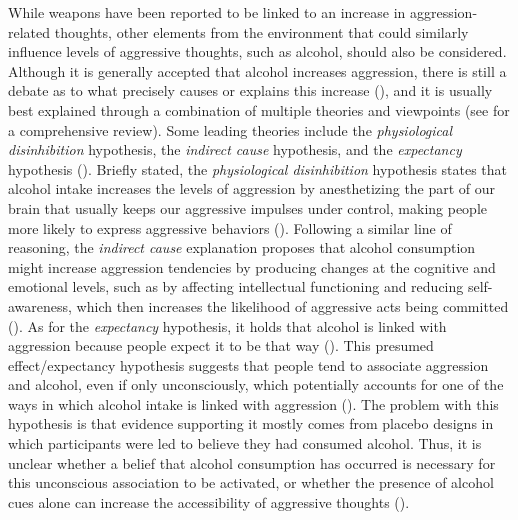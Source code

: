\documentclass[serif, authordate, twocolumn, empirical]{jote-article}
\begin{document}
While weapons have been reported to be linked to an increase in aggression-related thoughts, other elements from the environment that could similarly influence levels of aggressive thoughts, such as alcohol, should also be considered. Although it is generally accepted that alcohol increases aggression, there is still a debate as to what precisely causes or explains this increase (), and it is usually best explained through a combination of multiple theories and viewpoints (see   for a comprehensive review). Some leading theories include the \textit{physiological disinhibition} hypothesis, the \textit{indirect cause} hypothesis, and the \textit{expectancy }hypothesis (\cite{Bushman2002}). Briefly stated, the \textit{physiological disinhibition} hypothesis states that alcohol intake increases the levels of aggression by anesthetizing the part of our brain that usually keeps our aggressive impulses under control, making people more likely to express aggressive behaviors (\cite{Bushman2002}). Following a similar line of reasoning, the \textit{indirect cause} explanation proposes that alcohol consumption might increase aggression tendencies by producing changes at the cognitive and emotional levels, such as by affecting intellectual functioning and reducing self-awareness, which then increases the likelihood of aggressive acts being committed (\cite{Bushman2002}). As for the \textit{expectancy }hypothesis, it holds that alcohol is linked with aggression because people expect it to be that way (\cite{Bushman2002}). This presumed effect/expectancy hypothesis suggests that people tend to associate aggression and alcohol, even if only unconsciously, which potentially accounts for one of the ways in which alcohol intake is linked with aggression (). The problem with this hypothesis is that evidence supporting it mostly comes from placebo designs in which participants were led to believe they had consumed alcohol. Thus, it is unclear whether a belief that alcohol consumption has occurred is necessary for this unconscious association to be activated, or whether the presence of alcohol cues alone can increase the accessibility of aggressive thoughts (). 
\end{document}
